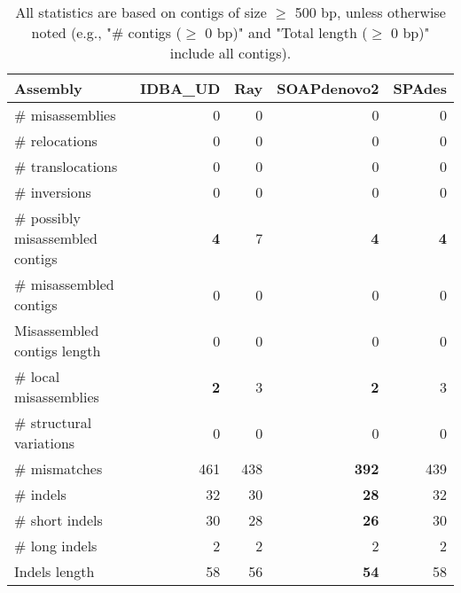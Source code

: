 \documentclass[12pt,a4paper]{article}
\begin{document}
\begin{table}[ht]
\begin{center}
\caption{All statistics are based on contigs of size $\geq$ 500 bp, unless otherwise noted (e.g., "\# contigs ($\geq$ 0 bp)" and "Total length ($\geq$ 0 bp)" include all contigs).}
\begin{tabular}{|l*{4}{|r}|}
\hline
Assembly & IDBA\_UD & Ray & SOAPdenovo2 & SPAdes \\ \hline
\# misassemblies & 0 & 0 & 0 & 0 \\ \hline
\hspace{5mm}\# relocations & 0 & 0 & 0 & 0 \\ \hline
\hspace{5mm}\# translocations & 0 & 0 & 0 & 0 \\ \hline
\hspace{5mm}\# inversions & 0 & 0 & 0 & 0 \\ \hline
\# possibly misassembled contigs & {\bf 4} & 7 & {\bf 4} & {\bf 4} \\ \hline
\# misassembled contigs & 0 & 0 & 0 & 0 \\ \hline
Misassembled contigs length & 0 & 0 & 0 & 0 \\ \hline
\# local misassemblies & {\bf 2} & 3 & {\bf 2} & 3 \\ \hline
\# structural variations & 0 & 0 & 0 & 0 \\ \hline
\# mismatches & 461 & 438 & {\bf 392} & 439 \\ \hline
\# indels & 32 & 30 & {\bf 28} & 32 \\ \hline
\hspace{5mm}\# short indels & 30 & 28 & {\bf 26} & 30 \\ \hline
\hspace{5mm}\# long indels & 2 & 2 & 2 & 2 \\ \hline
Indels length & 58 & 56 & {\bf 54} & 58 \\ \hline
\end{tabular}
\end{center}
\end{table}
\end{document}
